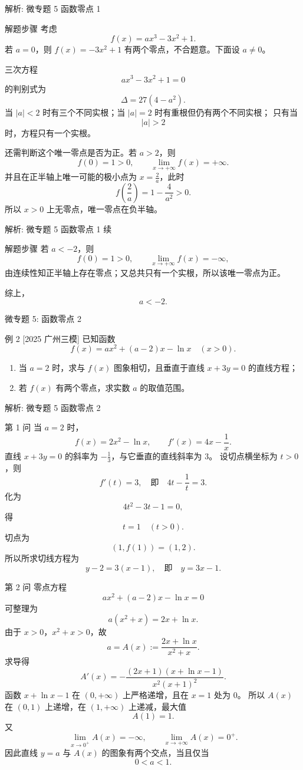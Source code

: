 ﻿\documentclass[aspectratio=169,10pt]{ctexbeamer}
\begin{document}
\begin{frame}[t,allowframebreaks]{解析: 微专题 5 函数零点 1}
\tiny
\begin{block}{解题步骤}
考虑
\[
f(x)=ax^3-3x^2+1.
\]
若 $a=0$，则 $f(x)=-3x^2+1$ 有两个零点，不合题意。下面设 $a\ne0$。

三次方程
\[
ax^3-3x^2+1=0
\]
的判别式为
\[
\Delta=27(4-a^2).
\]
当 $|a|<2$ 时有三个不同实根；当 $|a|=2$ 时有重根但仍有两个不同实根；
只有当
\[
|a|>2
\]
时，方程只有一个实根。

还需判断这个唯一零点是否为正。若 $a>2$，则
\[
f(0)=1>0,\qquad \lim_{x\to+\infty}f(x)=+\infty.
\]
并且在正半轴上唯一可能的极小点为 $x=\frac2a$，此时
\[
f\left(\frac2a\right)=1-\frac4{a^2}>0.
\]
所以 $x>0$ 上无零点，唯一零点在负半轴。
\end{block}
\end{frame}

\begin{frame}[t,allowframebreaks]{解析: 微专题 5 函数零点 1 续}
\tiny
\begin{block}{解题步骤}
若 $a<-2$，则
\[
f(0)=1>0,\qquad \lim_{x\to+\infty}f(x)=-\infty,
\]
由连续性知正半轴上存在零点；又总共只有一个实根，所以该唯一零点为正。

综上，
\[
a<-2.
\]
\end{block}
\end{frame}

\begin{frame}[t]{微专题 5: 函数零点 2}
\large
\begin{block}{例 2}
[2025 广州三模] 已知函数
\[
f(x)=ax^2+(a-2)x-\ln x \quad (x>0).
\]
\begin{enumerate}
  \item 当 $a=2$ 时，求与 $f(x)$ 图象相切，且垂直于直线 $x+3y=0$ 的直线方程；
  \item 若 $f(x)$ 有两个零点，求实数 $a$ 的取值范围。
\end{enumerate}
\end{block}
\end{frame}

\begin{frame}[t,allowframebreaks]{解析: 微专题 5 函数零点 2}
\tiny
\begin{block}{第 1 问}
当 $a=2$ 时，
\[
f(x)=2x^2-\ln x,\qquad f'(x)=4x-\frac1x.
\]
直线 $x+3y=0$ 的斜率为 $-\frac13$，与它垂直的直线斜率为 $3$。
设切点横坐标为 $t>0$，则
\[
f'(t)=3,\quad 即\quad 4t-\frac1t=3.
\]
化为
\[
4t^2-3t-1=0,
\]
得
\[
t=1\quad (t>0).
\]
切点为
\[
(1,f(1))=(1,2).
\]
所以所求切线方程为
\[
y-2=3(x-1),\quad 即\quad y=3x-1.
\]
\end{block}
\begin{block}{第 2 问}
零点方程
\[
ax^2+(a-2)x-\ln x=0
\]
可整理为
\[
a(x^2+x)=2x+\ln x.
\]
由于 $x>0$，$x^2+x>0$，故
\[
a=A(x):=\frac{2x+\ln x}{x^2+x}.
\]
求导得
\[
A'(x)=-\frac{(2x+1)(x+\ln x-1)}{x^2(x+1)^2}.
\]
函数 $x+\ln x-1$ 在 $(0,+\infty)$ 上严格递增，且在 $x=1$ 处为 $0$。
所以 $A(x)$ 在 $(0,1)$ 上递增，在 $(1,+\infty)$ 上递减，最大值
\[
A(1)=1.
\]
又
\[
\lim_{x\to0^+}A(x)=-\infty,\qquad \lim_{x\to+\infty}A(x)=0^+.
\]
因此直线 $y=a$ 与 $A(x)$ 的图象有两个交点，当且仅当
\[
0<a<1.
\]
\end{block}
\end{frame}
\end{document}
